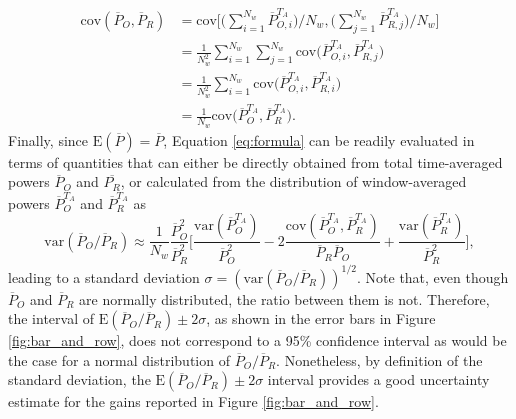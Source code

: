 \begin{align}
	\text{cov}(\overline{P}_O, \overline{P}_R) &= \text{cov} \Bigg[\bigg(\sum_{i=1}^{N_w}\overline{P}_{O,i}^{T_A}\bigg)/N_w, \bigg(\sum_{j=1}^{N_w}\overline{P}_{R,j}^{T_A}\bigg)/N_w \Bigg] \\
	&= \frac{1}{N_w^2} \sum_{i=1}^{N_w} \sum_{j=1}^{N_w} \text{cov}\bigg(\overline{P}_{O,i}^{T_A}, \overline{P}_{R,j}^{T_A} \bigg)\\
	&= \frac{1}{N_w^2} \sum_{i=1}^{N_w} \text{cov}\bigg(\overline{P}_{O,i}^{T_A}, \overline{P}_{R,i}^{T_A} \bigg)\\
	&= \frac{1}{N_w} \text{cov} \bigg( \overline{P}_O^{T_A}, \overline{P}_{R}^{T_A} \bigg).
\end{align}
\noindent Finally, since $\text{E}(\overline{P}) = \overline{P}$, Equation \eqref{eq:formula} can be readily evaluated in terms of quantities that can either be directly obtained from total time-averaged powers $\overline{P}_O$ and $\overline{P_R}$, or calculated from the distribution of window-averaged powers $\overline{P}^{T_A}_O$ and $\overline{P}^{T_A}_{R}$ as
\begin{equation}\label{eq:formula2}
\text{var} (\overline{P}_O / \overline{P}_R) \approx \frac{1}{N_w} \frac{\overline{P}_O^2}{\overline{P}_R^2} \bigg[ \frac{\text{var}(\overline{P}_O^{T_A})}{\overline{P}_O^2} - 2\frac{\text{cov}(\overline{P}_O^{T_A}, \overline{P}_R^{T_A})}{\overline{P}_R \overline{P}_O} + \frac{\text{var} (\overline{P}_R^{T_A})}{\overline{P}_R^2}  \bigg],
\end{equation}
leading to a standard deviation $\sigma = (\text{var} (\overline{P}_O / \overline{P}_R))^{1/2}$. Note that, even though $\overline{P}_O$ and $\overline{P}_R$ are normally distributed, the ratio between them is not. Therefore, the interval of $\text{E}(\overline{P}_O / \overline{P}_R) \pm 2 \sigma$, as shown in the error bars in Figure \ref{fig:bar_and_row}, does not correspond to a 95\% confidence interval as would be the case for a normal distribution of $\overline{P}_O / \overline{P}_R$. Nonetheless, by definition of the standard deviation, the $\text{E}(\overline{P}_O / \overline{P}_R) \pm 2 \sigma$ interval provides a good uncertainty estimate for the gains reported in Figure \ref{fig:bar_and_row}.

\cleardoublepage